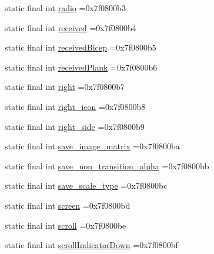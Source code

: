 \begin{DoxyCompactItemize}
\item 
static final int \mbox{\hyperlink{classcom_1_1example_1_1trainawearapplication_1_1_r_1_1id_af4db8d6df1420553b21897e2ff863012}{radio}} =0x7f0800b3
\item 
static final int \mbox{\hyperlink{classcom_1_1example_1_1trainawearapplication_1_1_r_1_1id_abde9cf658a452d88d13561ee362531fc}{received}} =0x7f0800b4
\item 
static final int \mbox{\hyperlink{classcom_1_1example_1_1trainawearapplication_1_1_r_1_1id_af143c762f4963c1963c86e1192fe14c5}{received\+Bicep}} =0x7f0800b5
\item 
static final int \mbox{\hyperlink{classcom_1_1example_1_1trainawearapplication_1_1_r_1_1id_a75f277a82ec05249c5f721f1e2224f7d}{received\+Plank}} =0x7f0800b6
\item 
static final int \mbox{\hyperlink{classcom_1_1example_1_1trainawearapplication_1_1_r_1_1id_a2b6c9a07996ade33e1e1222eac3fa756}{right}} =0x7f0800b7
\item 
static final int \mbox{\hyperlink{classcom_1_1example_1_1trainawearapplication_1_1_r_1_1id_aff4a31f29df4f33c15bfe90293d87867}{right\+\_\+icon}} =0x7f0800b8
\item 
static final int \mbox{\hyperlink{classcom_1_1example_1_1trainawearapplication_1_1_r_1_1id_aa02d62486d0d7108344aac8fa8d33042}{right\+\_\+side}} =0x7f0800b9
\item 
static final int \mbox{\hyperlink{classcom_1_1example_1_1trainawearapplication_1_1_r_1_1id_a23f3756289debc85e5df97bdcb29c332}{save\+\_\+image\+\_\+matrix}} =0x7f0800ba
\item 
static final int \mbox{\hyperlink{classcom_1_1example_1_1trainawearapplication_1_1_r_1_1id_a215d9c36bd3f703062653c6d132e3b60}{save\+\_\+non\+\_\+transition\+\_\+alpha}} =0x7f0800bb
\item 
static final int \mbox{\hyperlink{classcom_1_1example_1_1trainawearapplication_1_1_r_1_1id_a2099184b8f7db01d6892d0005eee0075}{save\+\_\+scale\+\_\+type}} =0x7f0800bc
\item 
static final int \mbox{\hyperlink{classcom_1_1example_1_1trainawearapplication_1_1_r_1_1id_af9005bf735609d760254a257f775c0a5}{screen}} =0x7f0800bd
\item 
static final int \mbox{\hyperlink{classcom_1_1example_1_1trainawearapplication_1_1_r_1_1id_a37777edced38ebd59b9f5c3f836e43d4}{scroll}} =0x7f0800be
\item 
static final int \mbox{\hyperlink{classcom_1_1example_1_1trainawearapplication_1_1_r_1_1id_a01bcb7c163f71f6a783904a4870c1789}{scroll\+Indicator\+Down}} =0x7f0800bf

\end{DoxyCompactItemize}
